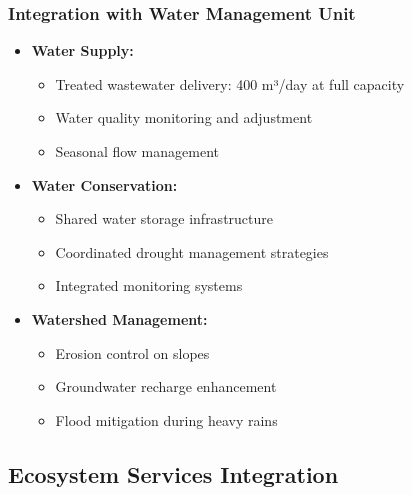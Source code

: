 \subsubsection{Integration with Water Management Unit}
\begin{itemize}
    \item \textbf{Water Supply:}
    \begin{itemize}
        \item Treated wastewater delivery: 400 m³/day at full capacity
        \item Water quality monitoring and adjustment
        \item Seasonal flow management
    \end{itemize}
    \item \textbf{Water Conservation:}
    \begin{itemize}
        \item Shared water storage infrastructure
        \item Coordinated drought management strategies
        \item Integrated monitoring systems
    \end{itemize}
    \item \textbf{Watershed Management:}
    \begin{itemize}
        \item Erosion control on slopes
        \item Groundwater recharge enhancement
        \item Flood mitigation during heavy rains
    \end{itemize}
\end{itemize}

\subsection{Ecosystem Services Integration}

